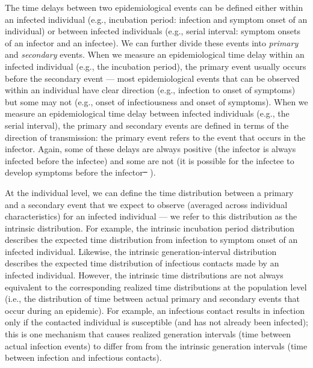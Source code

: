 \documentclass[12pt]{article}
\newcommand{\fref}[1]{Fig.~\ref{fig:#1}}
\providecommand{\DIFaddtex}[1]{{\protect\color{blue}\uwave{#1}}} %
\providecommand{\DIFdeltex}[1]{{\protect\color{red}\sout{#1}}}                      %
\providecommand{\DIFaddbegin}{} %
\providecommand{\DIFaddend}{} %
\providecommand{\DIFdelbegin}{} %
\providecommand{\DIFdelend}{} %
\providecommand{\DIFadd}[1]{\texorpdfstring{\DIFaddtex{#1}}{#1}} %
\providecommand{\DIFdel}[1]{\texorpdfstring{\DIFdeltex{#1}}{}} %
\newcommand{\DIFscaledelfig}{0.5}
\newlength{\DIFdelgraphicswidth} %
\newlength{\DIFdelgraphicsheight} %
\newcommand{\DIFaddincludegraphics}[2][]{{\color{blue}\fbox{\DIFOincludegraphics[#1]{#2}}}} %
\newcommand{\DIFdelincludegraphics}[2][]{%
\sbox{\DIFdelgraphicsbox}{\DIFOincludegraphics[#1]{#2}}%
\settoboxwidth{\DIFdelgraphicswidth}{\DIFdelgraphicsbox} %
\settoboxtotalheight{\DIFdelgraphicsheight}{\DIFdelgraphicsbox} %
\scalebox{\DIFscaledelfig}{%
\parbox[b]{\DIFdelgraphicswidth}{\usebox{\DIFdelgraphicsbox}\\[-\baselineskip] \rule{\DIFdelgraphicswidth}{0em}}\llap{\resizebox{\DIFdelgraphicswidth}{\DIFdelgraphicsheight}{%
\setlength{\unitlength}{\DIFdelgraphicswidth}%
\begin{picture}(1,1)%
\thicklines\linethickness{2pt} %
{\color[rgb]{1,0,0}\put(0,0){\framebox(1,1){}}}%
{\color[rgb]{1,0,0}\put(0,0){\line( 1,1){1}}}%
{\color[rgb]{1,0,0}\put(0,1){\line(1,-1){1}}}%
\end{picture}%
}\hspace*{3pt}}} %
} %
\DeclareRobustCommand{\DIFaddbegin}{\DIFOaddbegin \let\includegraphics\DIFaddincludegraphics} %
\DeclareRobustCommand{\DIFaddend}{\DIFOaddend \let\includegraphics\DIFOincludegraphics} %
\DeclareRobustCommand{\DIFdelbegin}{\DIFOdelbegin \let\includegraphics\DIFdelincludegraphics} %
\DeclareRobustCommand{\DIFdelend}{\DIFOaddend \let\includegraphics\DIFOincludegraphics} %
\begin{document}
The time delays between two epidemiological events can be defined either within an infected individual (e.g., incubation period: infection and symptom onset of an individual) or between infected individuals (e.g., serial interval: symptom onsets of an infector and an infectee).
We can further divide these events into \emph{primary} and \emph{secondary} events.
When we measure an epidemiological time delay within an infected individual (e.g., the incubation period), the primary event usually occurs before the secondary event ---
most epidemiological events that can be observed within an individual have clear direction (e.g., infection to onset of symptoms) but some may not (e.g., onset of infectiousness and onset of symptoms).
When we measure an epidemiological time delay between infected individuals (e.g., the serial interval), 
the primary and secondary events are defined in terms of the direction of transmission:
the primary event refers to the event that occurs in the infector. 
Again, some of these delays are always positive (the infector is always infected before the infectee) and some are not (it is possible for the infectee to develop symptoms before the infector\DIFdelbegin \DIFdel{\mbox{%
\citep{he2020temporal}}\hspace{0pt}%
}\DIFdelend ).

At the individual level, we can define the time distribution between a primary and a secondary event that we expect to observe (averaged across individual characteristics) for an infected individual --- we refer to this distribution as the intrinsic distribution.
For example, the intrinsic incubation period distribution describes the expected time distribution from infection to symptom onset of an infected individual.
Likewise, the intrinsic generation-interval distribution describes the expected time distribution of infectious contacts made by an infected individual.
However, the intrinsic time distributions are not always equivalent to the corresponding realized time distributions at the population level (i.e., the distribution of time between actual primary and secondary events that occur during an epidemic\DIFaddbegin \DIFadd{; see \fref{diagram}}\DIFaddend ).
For example, an infectious contact results in infection only if the contacted individual is susceptible (and has not already been infected);
this is one mechanism that causes realized generation intervals (time between actual infection events) to differ from from the intrinsic generation intervals (time between infection and infectious contacts).
\end{document}

